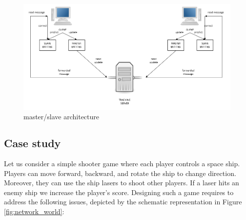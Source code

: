 \begin{figure}
	\centering
	\includegraphics[scale = 0.3]{Figures/masterslave}
	\caption{master/slave architecture}
	\label{fig:masterslave}
\end{figure}

\subsection*{Case study}
Let us consider a simple shooter game where each player controls a space ship. Players can move forward, backward, and rotate the ship to change direction. Moreover, they can use the ship lasers to shoot other players. If a laser hits an enemy ship we increase the player's score. Designing such a game requires to address the following issues, depicted by the schematic representation in Figure \ref{fig:network_world}:

